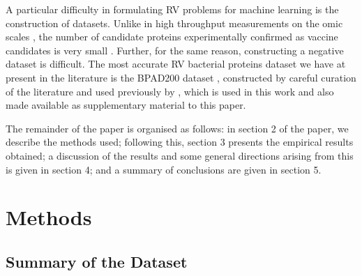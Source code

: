 \documentclass[10pt,journal,compsoc,twoside]{IEEEtran}
\begin{document}
A particular difficulty in formulating RV problems for machine learning is the construction of datasets. Unlike in high throughput measurements on the omic scales \cite{haussler-pnas-paper} \cite{spellman}, the number of candidate proteins experimentally confirmed as vaccine candidates is very small \cite{dalsass_2019}. Further, for the same reason, constructing a negative dataset is difficult. The most accurate RV bacterial proteins dataset we have at present in the literature is the BPAD200 dataset \cite{heinson_2017}, constructed by careful curation of the literature and used previously by \cite{heinson_2017} \cite{heinson_2019} \cite{dalsass_2019}, which is used in this work and also made available as supplementary material to this paper. 

The remainder of the paper is organised as follows: in section 2 of the paper, we describe the methods used; following this, section 3 presents the empirical results obtained; a discussion of the results and some general directions arising from this is given in section 4; and a summary of conclusions are given in section 5.


\section{Methods}
\label{sec:methods}

\subsection{Summary of the Dataset}
\label{sec:methods1}
\end{document}
